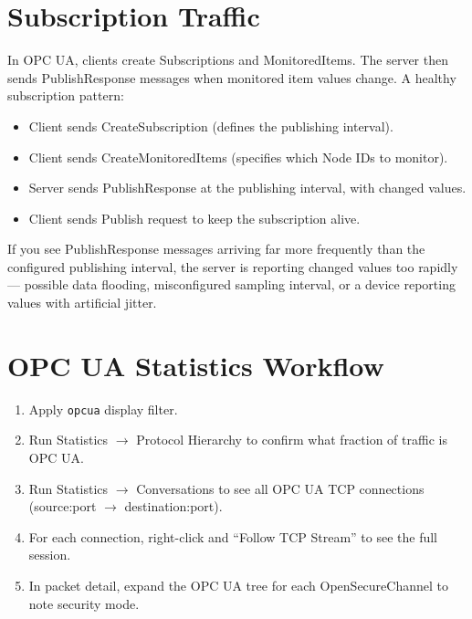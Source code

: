 \documentclass[12pt,twoside,openright]{memoir}
\newcommand{\filter}[1]{\texttt{\color{wsblue}#1}}
\begin{document}
\section{Subscription Traffic}

In OPC UA, clients create Subscriptions and MonitoredItems. The server then sends PublishResponse messages when monitored item values change. A healthy subscription pattern:

\begin{itemize}[noitemsep]
  \item Client sends CreateSubscription (defines the publishing interval).
  \item Client sends CreateMonitoredItems (specifies which Node IDs to monitor).
  \item Server sends PublishResponse at the publishing interval, with changed values.
  \item Client sends Publish request to keep the subscription alive.
\end{itemize}

If you see PublishResponse messages arriving far more frequently than the configured publishing interval, the server is reporting changed values too rapidly --- possible data flooding, misconfigured sampling interval, or a device reporting values with artificial jitter.

\section{OPC UA Statistics Workflow}

\begin{enumerate}[noitemsep]
  \item Apply \filter{opcua} display filter.
  \item Run Statistics $\to$ Protocol Hierarchy to confirm what fraction of traffic is OPC UA.
  \item Run Statistics $\to$ Conversations to see all OPC UA TCP connections (source:port $\to$ destination:port).
  \item For each connection, right-click and ``Follow TCP Stream'' to see the full session.
  \item In packet detail, expand the OPC UA tree for each OpenSecureChannel to note security mode.
\end{enumerate}

\end{document}
